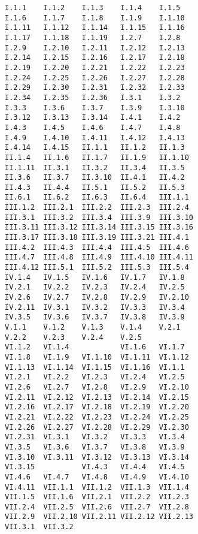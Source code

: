 \documentclass[main.tex]{subfiles}
\begin{document}
\noindent
\begin{verbatim}
I.1.1    I.1.2    I.1.3    I.1.4    I.1.5
I.1.6    I.1.7    I.1.8    I.1.9    I.1.10
I.1.11   I.1.12   I.1.14   I.1.15   I.1.16
I.1.17   I.1.18   I.1.19   I.2.7    I.2.8
I.2.9    I.2.10   I.2.11   I.2.12   I.2.13
I.2.14   I.2.15   I.2.16   I.2.17   I.2.18
I.2.19   I.2.20   I.2.21   I.2.22   I.2.23
I.2.24   I.2.25   I.2.26   I.2.27   I.2.28
I.2.29   I.2.30   I.2.31   I.2.32   I.2.33
I.2.34   I.2.35   I.2.36   I.3.1    I.3.2
I.3.3    I.3.6    I.3.7    I.3.9    I.3.10
I.3.12   I.3.13   I.3.14   I.4.1    I.4.2
I.4.3    I.4.5    I.4.6    I.4.7    I.4.8
I.4.9    I.4.10   I.4.11   I.4.12   I.4.13
I.4.14   I.4.15   II.1.1   II.1.2   II.1.3
II.1.4   II.1.6   II.1.7   II.1.9   II.1.10
II.1.11  II.3.1   II.3.2   II.3.4   II.3.5
II.3.6   II.3.7   II.3.10  II.4.1   II.4.2
II.4.3   II.4.4   II.5.1   II.5.2   II.5.3
II.6.1   II.6.2   II.6.3   II.6.4   III.1.1
III.1.2  III.2.1  III.2.2  III.2.3  III.2.4
III.3.1  III.3.2  III.3.4  III.3.9  III.3.10
III.3.11 III.3.12 III.3.14 III.3.15 III.3.16
III.3.17 III.3.18 III.3.19 III.3.21 III.4.1
III.4.2  III.4.3  III.4.4  III.4.5  III.4.6
III.4.7  III.4.8  III.4.9  III.4.10 III.4.11
III.4.12 III.5.1  III.5.2  III.5.3  III.5.4
IV.1.4   IV.1.5   IV.1.6   IV.1.7   IV.1.8
IV.2.1   IV.2.2   IV.2.3   IV.2.4   IV.2.5
IV.2.6   IV.2.7   IV.2.8   IV.2.9   IV.2.10
IV.2.11  IV.3.1   IV.3.2   IV.3.3   IV.3.4
IV.3.5   IV.3.6   IV.3.7   IV.3.8   IV.3.9
V.1.1    V.1.2    V.1.3    V.1.4    V.2.1
V.2.2    V.2.3    V.2.4    V.2.5           
VI.1.2   VI.1.4            VI.1.6   VI.1.7
VI.1.8   VI.1.9   VI.1.10  VI.1.11  VI.1.12
VI.1.13  VI.1.14  VI.1.15  VI.1.16  VI.1.1
VI.2.1   VI.2.2   VI.2.3   VI.2.4   VI.2.5
VI.2.6   VI.2.7   VI.2.8   VI.2.9   VI.2.10
VI.2.11  VI.2.12  VI.2.13  VI.2.14  VI.2.15
VI.2.16  VI.2.17  VI.2.18  VI.2.19  VI.2.20
VI.2.21  VI.2.22  VI.2.23  VI.2.24  VI.2.25
VI.2.26  VI.2.27  VI.2.28  VI.2.29  VI.2.30
VI.2.31  VI.3.1   VI.3.2   VI.3.3   VI.3.4
VI.3.5   VI.3.6   VI.3.7   VI.3.8   VI.3.9
VI.3.10  VI.3.11  VI.3.12  VI.3.13  VI.3.14
VI.3.15           VI.4.3   VI.4.4   VI.4.5
VI.4.6   VI.4.7   VI.4.8   VI.4.9   VI.4.10
VI.4.11  VII.1.1  VII.1.2  VII.1.3  VII.1.4
VII.1.5  VII.1.6  VII.2.1  VII.2.2  VII.2.3
VII.2.4  VII.2.5  VII.2.6  VII.2.7  VII.2.8
VII.2.9  VII.2.10 VII.2.11 VII.2.12 VII.2.13
VII.3.1  VII.3.2
\end{verbatim}
\end{document}
